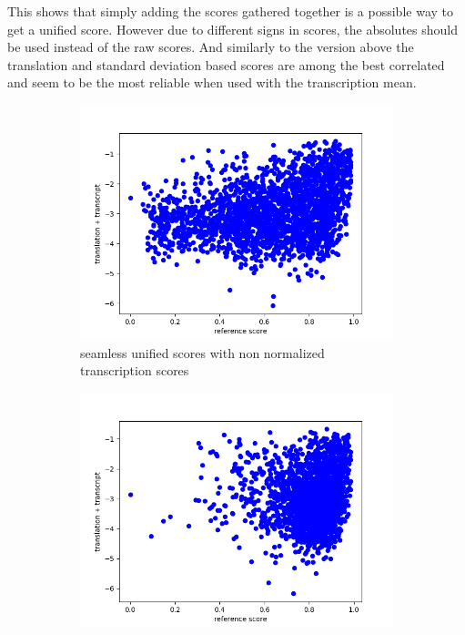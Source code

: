 This shows that simply adding the scores gathered together is a possible way to get a unified score. However due to different signs in scores, the absolutes should be used instead of the raw scores. And similarly to the version above the translation and standard deviation based scores are among the best correlated and seem to be the most reliable when used with the transcription mean. 
\begin{figure}[ht]
    \centering
    \begin{subfigure}{0.4\textwidth}
        \includegraphics[width=\linewidth]{Latex/sections/images/seamlesstranscripttranslation.png}
        \caption{seamless unified scores with non normalized transcription scores}
    \end{subfigure}
    \begin{subfigure}{0.4\textwidth}
        \includegraphics[width=\linewidth]{Latex/sections/images/dlmtranscripttranslation.png}

\end{subfigure}
\end{figure}
